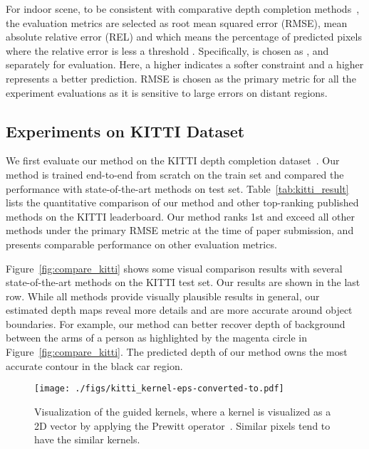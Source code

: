 \documentclass[journal]{IEEEtran}
\begin{document}
For indoor scene, to be consistent with comparative depth completion methods~\cite{depth_affinity, deep_lidar, self_supervised, cnn_confidence},
the evaluation metrics are selected as root mean squared error (RMSE), mean absolute relative error (REL) and
 which means the percentage of predicted pixels where the relative error is less a threshold .
Specifically,  is chosen as ,  and  separately for evaluation.
Here, a higher  indicates a softer constraint and a higher  represents a better prediction.
RMSE is chosen as the primary metric for all the experiment evaluations as it is sensitive to large errors on distant regions.



\subsection{Experiments on KITTI Dataset}
\label{subsec:result_kitti}

We first evaluate our method on the KITTI depth completion dataset~\cite{sparsity_cnn}.
Our method is trained end-to-end from scratch on the train set and compared the performance with state-of-the-art methods on test set. 
Table~\ref{tab:kitti_result} lists the quantitative comparison of our method and other top-ranking published methods on the  KITTI leaderboard.
Our method ranks 1st and exceed all other methods under the primary RMSE metric at the time of paper submission,
and presents comparable performance on other evaluation metrics. 




Figure~\ref{fig:compare_kitti} shows some visual comparison results with several state-of-the-art methods on the KITTI test set.
Our results are shown in the last row.
While all methods provide visually plausible results in general, our estimated depth maps reveal more details and are more accurate around object boundaries.
For example, our method can better recover depth of background between the arms of a person as highlighted by the magenta circle in Figure~\ref{fig:compare_kitti}.
The predicted depth of our method owns the most accurate contour in the black car region. 

\begin{figure*}
   \begin{center}
   \texttt{[image: ./figs/kitti\_kernel-eps-converted-to.pdf]}
   \end{center}
      \caption{Visualization of the guided kernels, where a kernel is visualized as a 2D vector by applying the Prewitt operator~\cite{prewitt}. Similar pixels tend to have the similar kernels.}
   \label{fig:flow}
\end{figure*}
\end{document}
